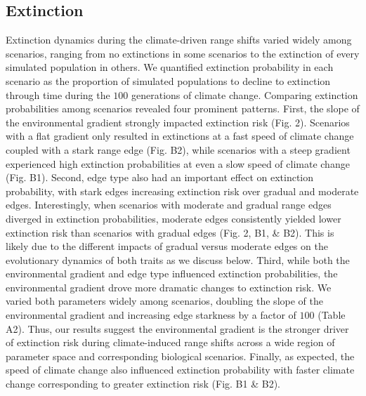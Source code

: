\documentclass[11pt]{article}
\begin{document}
\subsection*{Extinction}
Extinction dynamics during the climate-driven range shifts varied widely among scenarios, ranging from no extinctions in some scenarios to the extinction of every simulated population in others. We quantified extinction probability in each scenario as the proportion of simulated populations to decline to extinction through time during the $100$ generations of climate change. Comparing extinction probabilities among scenarios revealed four prominent patterns. First, the slope of the environmental gradient strongly impacted extinction risk (Fig. 2). Scenarios with a flat gradient only resulted in extinctions at a fast speed of climate change coupled with a stark range edge (Fig. B2), while scenarios with a steep gradient experienced high extinction probabilities at even a slow speed of climate change (Fig. B1). Second, edge type also had an important effect on extinction probability, with stark edges increasing extinction risk over gradual and moderate edges. Interestingly, when scenarios with moderate and gradual range edges diverged in extinction probabilities, moderate edges consistently yielded lower extinction risk than scenarios with gradual edges (Fig. 2, B1, \& B2). This is likely due to the different impacts of gradual versus moderate edges on the evolutionary dynamics of both traits as we discuss below. Third, while both the environmental gradient and edge type influenced extinction probabilities, the environmental gradient drove more dramatic changes to extinction risk. We varied both parameters widely among scenarios, doubling the slope of the environmental gradient and increasing edge starkness by a factor of $100$ (Table A2). Thus, our results suggest the environmental gradient is the stronger driver of extinction risk during climate-induced range shifts across a wide region of parameter space and corresponding biological scenarios. Finally, as expected, the speed of climate change also influenced extinction probability with faster climate change corresponding to greater extinction risk (Fig. B1 \& B2).
\end{document}
